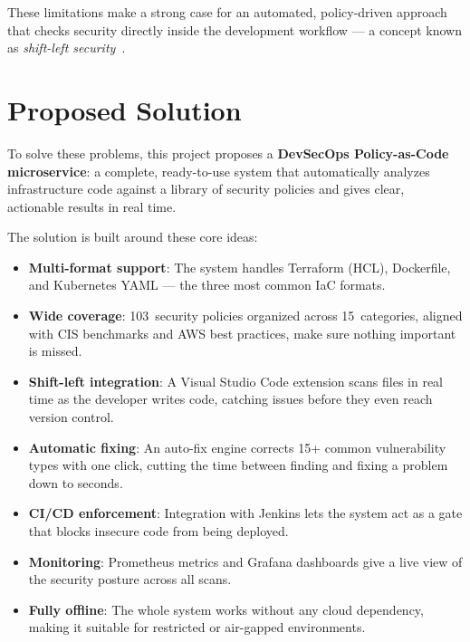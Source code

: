 These limitations make a strong case for an automated, policy-driven approach that checks security directly inside the development workflow --- a concept known as \emph{shift-left security}~\cite{mohan2016shiftleft}.


\section{Proposed Solution}
\label{sec:solution}

To solve these problems, this project proposes a \textbf{DevSecOps Policy-as-Code microservice}: a complete, ready-to-use system that automatically analyzes infrastructure code against a library of security policies and gives clear, actionable results in real time.

The solution is built around these core ideas:

\begin{itemize}[leftmargin=1.5cm]
  \item \textbf{Multi-format support}: The system handles Terraform (HCL), Dockerfile, and Kubernetes YAML --- the three most common IaC formats.
  
  \item \textbf{Wide coverage}: 103~security policies organized across 15~categories, aligned with CIS benchmarks and AWS best practices, make sure nothing important is missed.
  
  \item \textbf{Shift-left integration}: A Visual Studio Code extension scans files in real time as the developer writes code, catching issues before they even reach version control.
  
  \item \textbf{Automatic fixing}: An auto-fix engine corrects 15+ common vulnerability types with one click, cutting the time between finding and fixing a problem down to seconds.
  
  \item \textbf{CI/CD enforcement}: Integration with Jenkins lets the system act as a gate that blocks insecure code from being deployed.
  
  \item \textbf{Monitoring}: Prometheus metrics and Grafana dashboards give a live view of the security posture across all scans.
  
  \item \textbf{Fully offline}: The whole system works without any cloud dependency, making it suitable for restricted or air-gapped environments.
\end{itemize}


